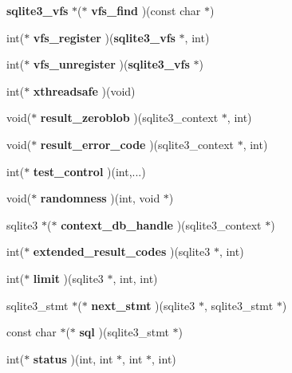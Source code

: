 \begin{CompactItemize}
\item 
{\bf sqlite3\_\-vfs} $\ast$($\ast$ \textbf{vfs\_\-find} )(const char $\ast$)\label{structsqlite3__api__routines_3b9749bc98464266911212e3b571f9d3}

\item 
int($\ast$ \textbf{vfs\_\-register} )({\bf sqlite3\_\-vfs} $\ast$, int)\label{structsqlite3__api__routines_9436d0293c93ea3aa35cf7aa794ed0e6}

\item 
int($\ast$ \textbf{vfs\_\-unregister} )({\bf sqlite3\_\-vfs} $\ast$)\label{structsqlite3__api__routines_28c15d0ffc8685e987ea18541f98c8e7}

\item 
int($\ast$ \textbf{xthreadsafe} )(void)\label{structsqlite3__api__routines_25a74c6b3c02e7251f035ce03876b8a8}

\item 
void($\ast$ \textbf{result\_\-zeroblob} )(sqlite3\_\-context $\ast$, int)\label{structsqlite3__api__routines_4f6430e30b489dde7afa225ab704eca0}

\item 
void($\ast$ \textbf{result\_\-error\_\-code} )(sqlite3\_\-context $\ast$, int)\label{structsqlite3__api__routines_33e15d94e505888a18a734f5bb12e091}

\item 
int($\ast$ \textbf{test\_\-control} )(int,...)\label{structsqlite3__api__routines_9749797cdc3abe3157e7e64de25b9f71}

\item 
void($\ast$ \textbf{randomness} )(int, void $\ast$)\label{structsqlite3__api__routines_5630ff8a2452b43e5e6a751068e16d6d}

\item 
sqlite3 $\ast$($\ast$ \textbf{context\_\-db\_\-handle} )(sqlite3\_\-context $\ast$)\label{structsqlite3__api__routines_c3934b6c328c2b96bd4d43a151a50955}

\item 
int($\ast$ \textbf{extended\_\-result\_\-codes} )(sqlite3 $\ast$, int)\label{structsqlite3__api__routines_1f78b8bab8274d0f71d8bae21353c938}

\item 
int($\ast$ \textbf{limit} )(sqlite3 $\ast$, int, int)\label{structsqlite3__api__routines_39a7782da1b101f003c77cb7feba963c}

\item 
sqlite3\_\-stmt $\ast$($\ast$ \textbf{next\_\-stmt} )(sqlite3 $\ast$, sqlite3\_\-stmt $\ast$)\label{structsqlite3__api__routines_92949cd4e4c4330f35403651f2b2568e}

\item 
const char $\ast$($\ast$ \textbf{sql} )(sqlite3\_\-stmt $\ast$)\label{structsqlite3__api__routines_afbaa0d319c4375458c4ba0a15f2d766}

\item 
int($\ast$ \textbf{status} )(int, int $\ast$, int $\ast$, int)\label{structsqlite3__api__routines_2cdcfe3ca0aaa5153a385f6c1e14b2df}

\end{CompactItemize}


